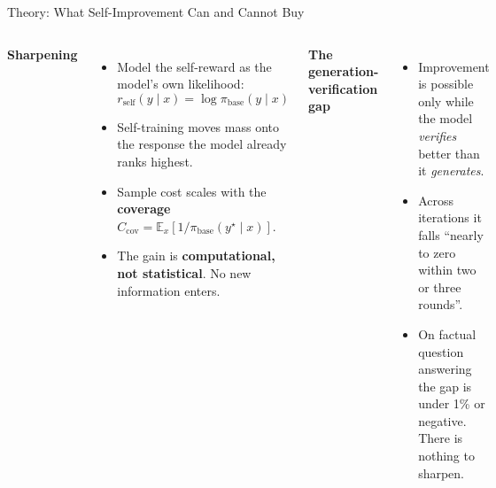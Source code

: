 \begin{frame}{Theory: What Self-Improvement Can and Cannot Buy}
    \begin{columns}[T,onlytextwidth]
        \textbf{Sharpening}
        \begin{itemize}\itemsep0.4em
            \item Model the self-reward as the model's own likelihood:
            \[
                r_{\text{self}}(y\mid x)=\log\pi_{\text{base}}(y\mid x)
            \]
            \item Self-training moves mass onto the response the model already ranks highest.
            \item Sample cost scales with the \textbf{coverage} $C_{\text{cov}}=\mathbb{E}_x[1/\pi_{\text{base}}(y^\star\mid x)]$.
            \item The gain is \textbf{computational, not statistical}. No new information enters.
        \end{itemize}
        \textbf{The generation-verification gap}
        \begin{itemize}\itemsep0.4em
            \item Improvement is possible only while the model \emph{verifies} better than it \emph{generates}.
            \item Across iterations it falls ``nearly to zero within two or three rounds''.
            \item On factual question answering the gap is under 1\% or negative. There is nothing to sharpen.
        \end{itemize}
    \end{columns}
    \vspace{0.4em}
\end{frame}

